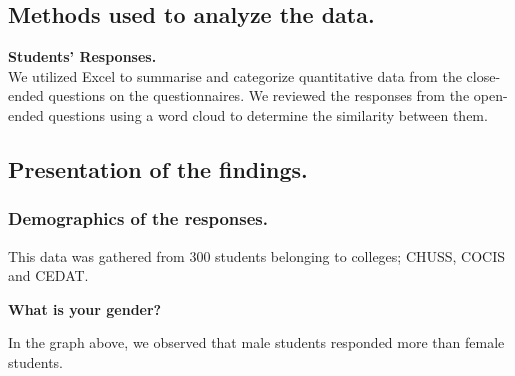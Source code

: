 \documentclass{article}
\begin{document}
\subsection{Methods used to analyze the data.}
\textbf{Students' Responses.}\\
We utilized Excel to summarise and categorize quantitative data from the close-ended questions on the questionnaires. We reviewed the responses from the open-ended questions using a word cloud to determine the similarity between them.

\subsection{Presentation of the findings.}
\subsubsection{Demographics of the responses.}

This data was gathered from 300 students belonging to colleges; CHUSS, COCIS and CEDAT.

\vspace{10pt}
\noindent\textbf{What is your gender?}
\begin{center}
\end{center}

\noindent In the graph above, we observed that male students responded more than female students.
\end{document}
